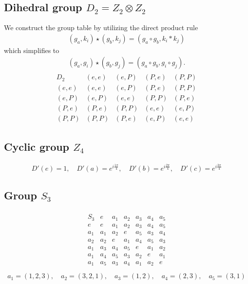 \documentclass[10pt,a4paper]{book}
\theoremstyle{definition}
\begin{document}
\subsection{Dihedral group \texorpdfstring{$D_2=Z_2\otimes Z_2$}{TEXT}}
We construct the group table by utilizing the direct product rule
\begin{align}
(g_a,k_i)\star(g_b,k_j)=(g_a\circ g_b,k_i*k_j)
\end{align}
which simplifies to
\begin{align}
(g_a,g_i)\star(g_b,g_j)=(g_a\circ g_b,g_i\circ g_j).
\end{align}
\begin{align}
\begin{array}{c||cccc}
D_2   & (e,e) & (e,P) & (P,e) & (P,P) \\ \hline\hline
(e,e) & (e,e) & (e,P) & (P,e) & (P,P) \\
(e,P) & (e,P) & (e,e) & (P,P) & (P,e) \\
(P,e) & (P,e) & (P,P) & (e,e) & (e,P) \\
(P,P) & (P,P) & (P,e) & (e,P) & (e,e)
\end{array}
\end{align}


\subsection{Cyclic group \texorpdfstring{$Z_4$}{TEXT}}
\begin{align}
D'(e)=1,\quad 
D'(a)=e^{i\frac{1\pi}{4}},\quad 
D'(b)=e^{i\frac{2\pi}{4}},\quad 
D'(c)=e^{i\frac{3\pi}{4}}
\end{align}

\subsection{Group \texorpdfstring{$S_3$}{TEXT}}
\begin{align}
\begin{array}{c||cccccc}
S_3 & e   & a_1 & a_2 & a_3 & a_4 & a_5\\ \hline\hline
e   & e   & a_1 & a_2 & a_3 & a_4 & a_5\\
a_1 & a_1 & a_2 & e   & a_5 & a_3 & a_4 \\
a_2 & a_2 & e   & a_1 & a_4 & a_5 & a_3 \\
a_1 & a_3 & a_4 & a_5 & e   & a_1 & a_2 \\
a_1 & a_4 & a_5 & a_3 & a_2 & e   & a_1 \\
a_1 & a_5 & a_3 & a_4 & a_1 & a_2 & e \\
\end{array}
\end{align}
\begin{align}
a_1=(1,2,3),\quad a_2=(3,2,1),\quad a_3=(1,2),\quad a_4=(2,3),\quad a_5=(3, 1) 
\end{align}
\end{document}
